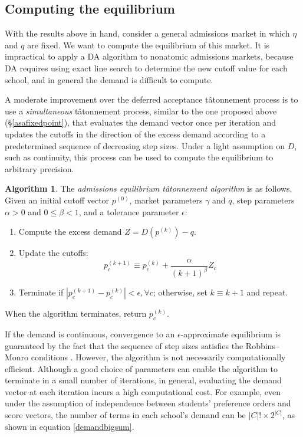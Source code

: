 \documentclass[12pt]{article}
\theoremstyle{definition}
\newtheorem{algorithm}{Algorithm}
\begin{document}
\subsection{Computing the equilibrium} \label{computingtheeq}
With the results above in hand, consider a general admissions market in which $\eta$ and $q$ are fixed. We want to compute the equilibrium of this market. It is impractical to apply a DA algorithm to nonatomic admissions markets, because DA requires using exact line search to determine the new cutoff value for each school, and in general the demand is difficult to compute.

A moderate improvement over the deferred acceptance t\^{a}tonnement process is to use a \emph{simultaneous} t\^{a}tonnement process, similar to the one proposed above (\S\ref{asafixedpoint}), that evaluates the demand vector once per iteration and updates the cutoffs in the direction of the excess demand according to a predetermined sequence of decreasing step sizes. Under a light assumption on $D$, such as continuity, this process can be used to compute the equilibrium to arbitrary precision.
\begin{algorithm} \label{admissionseqtatalgo}
The \emph{admissions equilibrium t\^{a}tonnement algorithm} is as follows. Given an initial cutoff vector $p^{(0)}$, market parameters $\gamma$ and $q$, step parameters $\alpha >0$ and $0 \leq \beta < 1$, and a tolerance parameter $\epsilon$:
\begin{enumerate}
\item Compute the excess demand $Z = D (p^{(k)}) - q$. 
\item Update the cutoffs:
\[ p_c^{(k+1)} \equiv p_c^{(k)} + \frac{\alpha}{(k+1)^\beta} Z_c\]
\item Terminate if $| p_c^{(k+1)} - p_c^{(k)} | < \epsilon, \forall c$; otherwise, set $k \equiv k+1$ and repeat. 
\end{enumerate}
When the algorithm terminates, return $p_c^{(k)}$. 
\end{algorithm}
If the demand is continuous, convergence to an $\epsilon$-approximate equilibrium is guaranteed by the fact that the sequence of step sizes satisfies the Robbins--Monro conditions \parencite[][]{robbinsmonro}. However, the algorithm is not necessarily computationally efficient. Although a good choice of parameters can enable the algorithm to terminate in a small number of iterations, in general, evaluating the demand vector at each iteration incurs a high computational cost. For example, even under the assumption of independence between students' preference orders and score vectors, the number of terms in each school's demand can be $|C|! \times 2^{|C|}$, as shown in equation \eqref{demandbigsum}.
\end{document}
